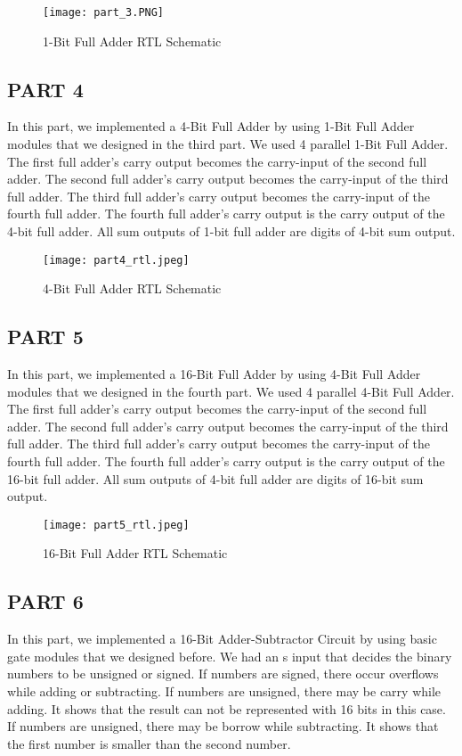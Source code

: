 \documentclass[pdftex,12pt,a4paper]{article}
\begin{document}
\begin{figure}[ht]
	\centering
	\texttt{[image: part\_3.PNG]}	
	\caption{1-Bit Full Adder RTL Schematic}
	\label{fig6}
\end{figure}
\clearpage

\subsection{PART 4}
In this part, we implemented a 4-Bit Full Adder by using 1-Bit Full Adder modules that we designed in the third part. We used 4 parallel 1-Bit Full Adder. The first full adder's carry output becomes the carry-input of the second full adder. The second full adder's carry output becomes the carry-input of the third full adder. The third full adder's carry output becomes the carry-input of the fourth full adder. The fourth full adder's carry output is the carry output of the 4-bit full adder. All sum outputs of 1-bit full adder are digits of 4-bit sum output.
\begin{figure}[ht]
	\centering
	\texttt{[image: part4\_rtl.jpeg]}	
	\caption{4-Bit Full Adder RTL Schematic}
	\label{fig7}
\end{figure}

\clearpage

\subsection{PART 5}
In this part, we implemented a 16-Bit Full Adder by using 4-Bit Full Adder modules that we designed in the fourth part. We used 4 parallel 4-Bit Full Adder. The first full adder’s carry output becomes the carry-input of the second full adder. The second full adder’s carry output becomes the carry-input of the third full adder. The third full adder’s carry output becomes the carry-input of the fourth full adder. The fourth full adder’s carry output is the carry output of the 16-bit full adder. All sum outputs of 4-bit full adder are digits of 16-bit sum output.
\begin{figure}[ht]
	\centering
	\texttt{[image: part5\_rtl.jpeg]}	
	\caption{16-Bit Full Adder RTL Schematic}
	\label{fig8}
\end{figure}

\clearpage

\subsection{PART 6}
In this part, we implemented a 16-Bit Adder-Subtractor Circuit by using basic gate modules that we designed before. We had an s input that decides the binary numbers to be unsigned or signed. If numbers are signed, there occur overflows while adding or subtracting.  If numbers are unsigned, there may be carry while adding. It shows that the result can not be represented with 16 bits in this case. If numbers are unsigned, there may be borrow while subtracting. It shows that the first number is smaller than the second number.
\end{document}
